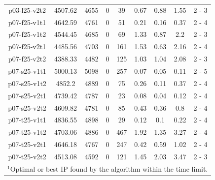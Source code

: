 \begin{table}[h!tbp]
\begin {tabular}[t]{|c|c|c|c|c|c|c|c|c|}
p03-l25-v2t2	&	4507.62	&	4655	&	0	&	39	&	0.67	&	0.88	&	1.55	&	2	-	3	\\
p07-f25-v1t1	&	4642.59	&	4761	&	0	&	51	&	0.21	&	0.16	&	0.37	&	2	-	4	\\
p07-f25-v1t2	&	4544.45	&	4685	&	0	&	69	&	1.33	&	0.87	&	2.2	&	2	-	3	\\
p07-f25-v2t1	&	4485.56	&	4703	&	0	&	161	&	1.53	&	0.63	&	2.16	&	2	-	4	\\
p07-f25-v2t2	&	4388.33	&	4482	&	0	&	125	&	1.03	&	1.04	&	2.08	&	2	-	3	\\
p07-s25-v1t1	&	5000.13	&	5098	&	0	&	257	&	0.07	&	0.05	&	0.11	&	2	-	5	\\
p07-s25-v1t2	&	4852.2	&	4889	&	0	&	75	&	0.26	&	0.11	&	0.37	&	2	-	4	\\
p07-s25-v2t1	&	4739.42	&	4787	&	0	&	23	&	0.08	&	0.04	&	0.12	&	2	-	4	\\
p07-s25-v2t2	&	4609.82	&	4781	&	0	&	85	&	0.43	&	0.36	&	0.8	&	2	-	4	\\
p07-t25-v1t1	&	4836.55	&	4898	&	0	&	29	&	0.12	&	0.1	&	0.22	&	2	-	4	\\
p07-t25-v1t2	&	4703.06	&	4886	&	0	&	467	&	1.92	&	1.35	&	3.27	&	2	-	4	\\
p07-t25-v2t1	&	4646.18	&	4767	&	0	&	247	&	0.42	&	0.59	&	1.02	&	2	-	4	\\
p07-t25-v2t2	&	4513.08	&	4592	&	0	&	121	&	1.45	&	2.03	&	3.47	&	2	-	3	\\\hline
\multicolumn{9}{l}{$^1$Optimal or best IP found by the algorithm within the time limit.}\\
\end{tabular}
\end{table} 


